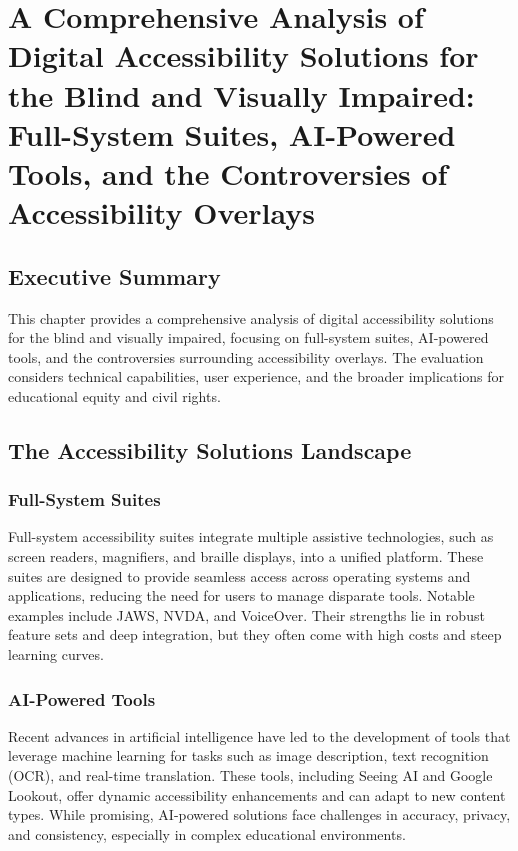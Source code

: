 \chapter{A Comprehensive Analysis of Digital Accessibility Solutions for the Blind and Visually Impaired: Full-System Suites, AI-Powered Tools, and the Controversies of Accessibility Overlays}

\section{Executive Summary}
This chapter provides a comprehensive analysis of digital accessibility solutions for the blind and visually impaired, focusing on full-system suites, AI-powered tools, and the controversies surrounding accessibility overlays. The evaluation considers technical capabilities, user experience, and the broader implications for educational equity and civil rights.

\section{The Accessibility Solutions Landscape}
\subsection{Full-System Suites}
Full-system accessibility suites integrate multiple assistive technologies, such as screen readers, magnifiers, and braille displays, into a unified platform. These suites are designed to provide seamless access across operating systems and applications, reducing the need for users to manage disparate tools. Notable examples include JAWS, NVDA, and VoiceOver\supercite{Lee2019}. Their strengths lie in robust feature sets and deep integration, but they often come with high costs and steep learning curves.

\subsection{AI-Powered Tools}
Recent advances in artificial intelligence have led to the development of tools that leverage machine learning for tasks such as image description, text recognition (OCR), and real-time translation. These tools, including Seeing AI and Google Lookout, offer dynamic accessibility enhancements and can adapt to new content types\supercite{Kim2023}. While promising, AI-powered solutions face challenges in accuracy, privacy, and consistency, especially in complex educational environments.


